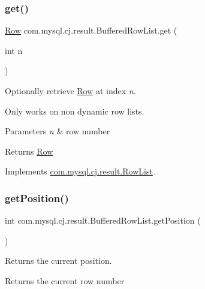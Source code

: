 \subsubsection{\texorpdfstring{get()}{get()}}
{\footnotesize\ttfamily \mbox{\hyperlink{interfacecom_1_1mysql_1_1cj_1_1result_1_1_row}{Row}} com.\+mysql.\+cj.\+result.\+Buffered\+Row\+List.\+get (\begin{DoxyParamCaption}\item[{int}]{n }\end{DoxyParamCaption})}

Optionally retrieve \mbox{\hyperlink{interfacecom_1_1mysql_1_1cj_1_1result_1_1_row}{Row}} at index {\itshape n}.

Only works on non dynamic row lists.


\begin{DoxyParams}{Parameters}
{\em n} & row number \\
\hline
\end{DoxyParams}
\begin{DoxyReturn}{Returns}
\mbox{\hyperlink{interfacecom_1_1mysql_1_1cj_1_1result_1_1_row}{Row}} 
\end{DoxyReturn}


Implements \mbox{\hyperlink{interfacecom_1_1mysql_1_1cj_1_1result_1_1_row_list_ac5f33b198acdb87ba7ab84da6cddef93}{com.\+mysql.\+cj.\+result.\+Row\+List}}.

\mbox{\label{classcom_1_1mysql_1_1cj_1_1result_1_1_buffered_row_list_a6d18ed3e3cf3ebced974d1cd7d8ca9ec}} 
\subsubsection{\texorpdfstring{get\+Position()}{getPosition()}}
{\footnotesize\ttfamily int com.\+mysql.\+cj.\+result.\+Buffered\+Row\+List.\+get\+Position (\begin{DoxyParamCaption}{ }\end{DoxyParamCaption})}

Returns the current position.

\begin{DoxyReturn}{Returns}
the current row number 
\end{DoxyReturn}


